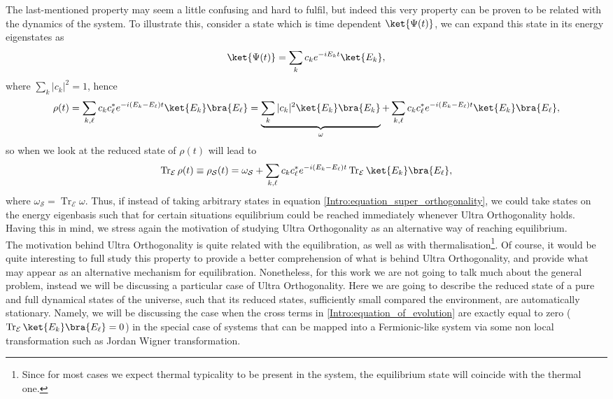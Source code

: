 \indent The last-mentioned property may seem a little confusing and hard to fulfil, but indeed this very property can be proven to be related with the dynamics of the system. To illustrate this, consider a state which is time dependent $\ket{\Psi(t)}$, we can expand this state in its energy eigenstates as
\begin{equation}
\ket{\Psi(t)}=\sum_{k} c_k e^{-iE_kt}\ket{E_k},
\end{equation}
where $\sum_k|c_k|^2=1$, hence
\begin{equation}
\rho(t) = \sum_{ k,\ell}c_kc^*_\ell e^{-i(E_k-E_\ell)t}\ket{E_k}\bra{E_\ell} = \underbrace{\sum_{ k}|c_k|^2 \ket{E_k}\bra{E_k}}_{\omega}+\sum_{ k,\ell}c_kc^*_\ell e^{-i(E_k-E_\ell)t}\ket{E_k}\bra{E_\ell},
\end{equation}
so when we look at the reduced state of $\rho(t)$ will lead to
\begin{equation}
\operatorname{Tr}_{\mathcal{E}} \rho(t) \equiv \rho_{\mathcal{S}}(t) =\omega_{\mathcal{S}} + \sum_{ k,\ell}c_kc^*_\ell e^{-i(E_k-E_\ell)t}\operatorname{Tr}_{\mathcal{E}}\ket{E_k}\bra{E_\ell},
\label{Intro:equation_of_evolution}
\end{equation}
where $\omega_{\mathcal{S}} = \operatorname{Tr}_{\mathcal{E}} \omega$. Thus, if instead of taking arbitrary states in equation \eqref{Intro:equation_super_orthogonality}, we could take states on the energy eigenbasis such that for certain situations equilibrium could be reached immediately whenever Ultra Orthogonality holds. Having this in mind, we stress again the motivation of studying Ultra Orthogonality as an alternative way of reaching equilibrium.\\

\indent The motivation behind Ultra Orthogonality is quite related with the equilibration, as well as with thermalisation\footnote{ Since for most cases we expect thermal typicality to be present in the system, the equilibrium state will coincide with the thermal one.}. Of course, it would be quite interesting to full study this property to provide a better comprehension of what is behind Ultra Orthogonality, and provide what may appear as an alternative mechanism for equilibration. Nonetheless, for this work we are not going to talk much about the general problem, instead we will be discussing a particular case of Ultra Orthogonality. Here we are going to describe the reduced state of a pure and full dynamical states of the universe, such that its reduced states, sufficiently small compared the environment, are automatically stationary. Namely, we will be discussing the case when the cross terms in \eqref{Intro:equation_of_evolution} are exactly equal to zero ($\operatorname{Tr}_{\mathcal{E}}\ket{E_k}\bra{E_\ell} = 0$) in the special case of systems that can be mapped into a Fermionic-like system via some non local transformation such as Jordan Wigner transformation.\\

